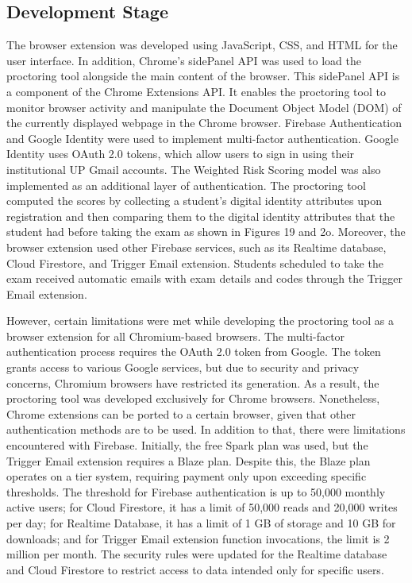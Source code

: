 \documentclass{icsthesis}
\begin{document}
\begin{mainmatter}
\subsection{Development Stage}
The browser extension was developed using JavaScript, CSS, and HTML for the user interface. In addition, Chrome's sidePanel API was used to load the proctoring tool alongside the main content of the browser. This sidePanel API is a component of the Chrome Extensions API. It enables the proctoring tool to monitor browser activity and manipulate the Document Object Model (DOM) of the currently displayed webpage in the Chrome browser. Firebase Authentication and Google Identity were used to implement multi-factor authentication. Google Identity uses OAuth 2.0 tokens, which allow users to sign in using their institutional UP Gmail accounts. The Weighted Risk Scoring model was also implemented as an additional layer of authentication. The proctoring tool computed the scores by collecting a student's digital identity attributes upon registration and then comparing them to the digital identity attributes that the student had before taking the exam as shown in Figures 19 and 2o. Moreover, the browser extension used other Firebase services, such as its Realtime database, Cloud Firestore, and Trigger Email extension. Students scheduled to take the exam received automatic emails with exam details and codes through the Trigger Email extension.
    
However, certain limitations were met while developing the proctoring tool as a browser extension for all Chromium-based browsers. The multi-factor authentication process requires the OAuth 2.0 token from Google. The token grants access to various Google services, but due to security and privacy concerns, Chromium browsers have restricted its generation. As a result, the proctoring tool was developed exclusively for Chrome browsers. Nonetheless, Chrome extensions can be ported to a certain browser, given that other authentication methods are to be used. In addition to that, there were limitations encountered with Firebase. Initially, the free Spark plan was used, but the Trigger Email extension requires a Blaze plan. Despite this, the Blaze plan operates on a tier system, requiring payment only upon exceeding specific thresholds. The threshold for Firebase authentication is up to 50,000 monthly active users; for Cloud Firestore, it has a limit of 50,000 reads and 20,000 writes per day; for Realtime Database, it has a limit of 1 GB of storage and 10 GB for downloads; and for Trigger Email extension function invocations, the limit is 2 million per month. The security rules were updated for the Realtime database and Cloud Firestore to restrict access to data intended only for specific users.


\end{mainmatter}
\end{document}
